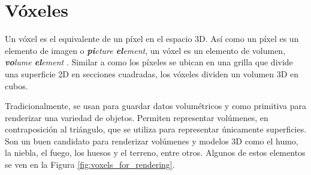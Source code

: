 \section{Vóxeles}\label{sec:voxels}

Un vóxel es el equivalente de un píxel en el espacio 3D.
Así como un píxel es un elemento de imagen o \textit{\textbf{pi}cture \textbf{el}ement}, un vóxel es un elemento de volumen, \textit{\textbf{vo}lume \textbf{el}ement} \cite{rtr}.
Similar a como los píxeles se ubican en una grilla que divide una superficie 2D en secciones cuadradas, los vóxeles dividen un volumen 3D en cubos.

Tradicionalmente, se usan para guardar datos volumétricos y como primitiva para renderizar una variedad de objetos.
Permiten representar volúmenes, en contraposición al triángulo, que se utiliza para representar únicamente superficies.
Son un buen candidato para renderizar volúmenes y modelos 3D como el humo, la niebla, el fuego, los huesos y el terreno, entre otros.
Algunos de estos elementos se ven en la Figura \ref{fig:voxels_for_rendering}. %


